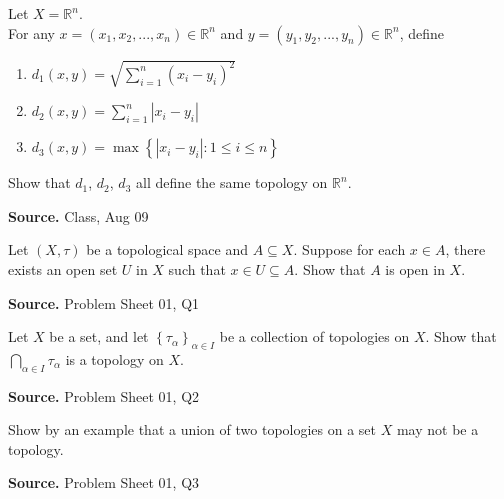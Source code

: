 \documentclass[12pt,twoside]{report}
\newenvironment*{source}{\hfill\scriptsize\textbf{Source.}\space}{\par}
\begin{document}
\begin{samepage}
\begin{ex}
Let $X = \mathbb{R} ^n$. \\
For any $x = \left (x_1, x_2, ..., x_n\right ) \in \mathbb{R} ^n$ and 
$y = \left (y_1, y_2, ..., y_n\right ) \in \mathbb{R} ^n$, define 
\begin{enumerate}
    \item $ d_1 \left (x,y\right ) = \sqrt { \sum_{i = 1}^n \left (x_i - y_i\right ) ^2 } $
    \item $ d_2 \left (x,y\right ) = \sum_{i = 1}^n |x_i - y_i| $
    \item $ d_3 \left (x,y\right ) = \displaystyle\max \left\{ | x_i - y_i |  :  1 \leq i \leq n \right\} $
\end{enumerate}
Show that $d_1$, $d_2$, $d_3$ all define the same topology on $\mathbb{R} ^n$.
\end{ex}
\begin{source}
Class, Aug 09
\end{source}
\end{samepage}

\begin{samepage}
\begin{ex}
Let $\left (X, \tau\right )$ be a topological space and $A \subseteq X$.
Suppose for each $x \in A$, there exists an open set $U$ in $X$ such that $x \in U \subseteq A$. Show that $A$ is open in $X$.
\end{ex}
\begin{source}
Problem Sheet 01, Q1
\end{source}
\end{samepage}

\begin{samepage}
\begin{ex}
Let $X$ be a set, and let $ \left\{ \tau_\alpha \right\}_{ \alpha \in I } $ be a collection of topologies on $X$. 
Show that $ \displaystyle\bigcap_{\alpha \in I} \tau_\alpha $ is a topology on $X$.
\end{ex}
\begin{source}
Problem Sheet 01, Q2
\end{source}
\end{samepage}

\begin{samepage}
\begin{ex}
Show by an example that a union of two topologies on a set $X$ may not be a topology.
\end{ex}
\begin{source}
Problem Sheet 01, Q3
\end{source}
\end{samepage}
\end{document}
